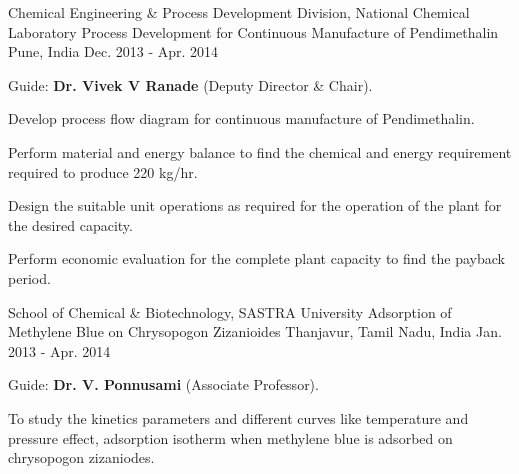 

\begin{cventries}

  \cventry
    {Chemical Engineering \& Process Development Division, National Chemical Laboratory} %
    {Process Development for Continuous Manufacture of Pendimethalin} %
    {Pune, India} %
    {Dec. 2013 - Apr. 2014} %
    {
      \begin{cvitems} %
        \item {Guide: \textbf{Dr. Vivek V Ranade} (Deputy Director \& Chair).}
        \item {Develop process flow diagram for continuous manufacture of Pendimethalin.}
        \item {Perform material and energy balance to find the chemical and energy requirement required to produce 220 kg/hr.}
        \item {Design the suitable unit operations as required for the operation of the plant for the desired capacity.}
        \item {Perform economic evaluation for the complete plant capacity to find the payback period.}
      \end{cvitems}
    }

  \cventry
    {School of Chemical \& Biotechnology, SASTRA University} %
    {Adsorption of Methylene Blue on Chrysopogon Zizanioides} %
    {Thanjavur, Tamil Nadu, India} %
    {Jan. 2013 - Apr. 2014} %
    {
      \begin{cvitems} %
        \item {Guide: \textbf{Dr. V. Ponnusami} (Associate Professor).}
        \item {To study the kinetics parameters and different curves like temperature and pressure effect, adsorption isotherm when methylene blue is adsorbed on chrysopogon zizaniodes.}
      \end{cvitems}
    }

\end{cventries}

